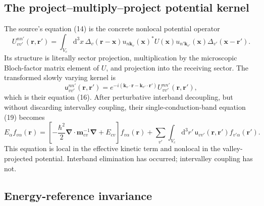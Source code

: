 \subsection{The project--multiply--project potential kernel}

The source's equation (14) is the concrete nonlocal potential operator
\begin{equation}
  U^{nn'}_{vv'}(\mathbf r,\mathbf r')
  =
  \int_{V_c}\!\mathrm{d}^3x\,
  \Delta_v(\mathbf r-\mathbf x)
  u_{n\mathbf k_v}(\mathbf x)^{*}U(\mathbf x)
  u_{n'\mathbf k_{v'}}(\mathbf x)
  \Delta_{v'}(\mathbf x-\mathbf r').
  \label{eq:ermoneit-project-multiply-project}
\end{equation}
Its structure is literally sector projection, multiplication by the microscopic
Bloch-factor matrix element of $U$, and projection into the receiving sector.
The transformed slowly varying kernel is
\begin{equation}
  \mathsf u^{nn'}_{vv'}(\mathbf r,\mathbf r')
  =
  e^{-i(\mathbf k_v\cdot\mathbf r-
         \mathbf k_{v'}\cdot\mathbf r')}
  U^{nn'}_{vv'}(\mathbf r,\mathbf r'),
  \label{eq:ermoneit-slow-kernel}
\end{equation}
which is their equation (16). After perturbative interband decoupling, but
without discarding intervalley coupling, their single-conduction-band equation
(19) becomes
\begin{equation}
  E_\alpha f_{v\alpha}(\mathbf r)
  =
  \left[-\frac{\hbar^2}{2}
    \boldsymbol\nabla\mathbin{\cdot}\mathbf m_{cv}^{-1}
    \boldsymbol\nabla+E_{cv}\right]f_{v\alpha}(\mathbf r)
  +
  \sum_{v'}\int_{V_c}\!\mathrm{d}^3r'\,
  \mathsf u_{vv'}(\mathbf r,\mathbf r')
  f_{v'\alpha}(\mathbf r').
  \label{eq:ermoneit-single-band-nonlocal}
\end{equation}
This equation is local in the effective kinetic term and nonlocal in the
valley-projected potential. Interband elimination has occurred; intervalley
coupling has not.

\subsection{Energy-reference invariance}

